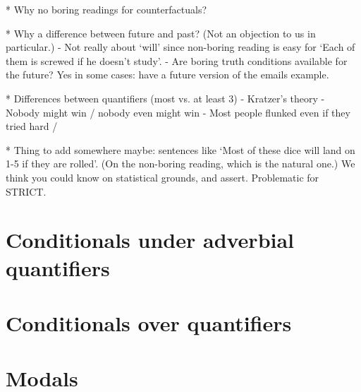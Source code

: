\documentclass[If.tex]{subfiles}
\begin{document}
* Why no boring readings for counterfactuals?

* Why a difference between future and past?  (Not an objection to us in particular.)
	- Not really about ‘will’ since non-boring reading is easy for ‘Each of them is screwed if he doesn't study’.
	- Are boring truth conditions available for the future?  Yes in some cases: have a future version of the emails example.  

* Differences between quantifiers (most vs. at least 3)
	- Kratzer's theory
	- Nobody might win / nobody even might win
	- Most people flunked even if they tried hard / 

* Thing to add somewhere maybe: sentences like ‘Most of these dice will land on 1-5 if they are rolled’.  (On the non-boring reading, which is the natural one.)  We think you could know on statistical grounds, and assert.  Problematic for STRICT.  



















\section{Conditionals under adverbial quantifiers}

\section{Conditionals over quantifiers}

\section{Modals}
\end{document}
